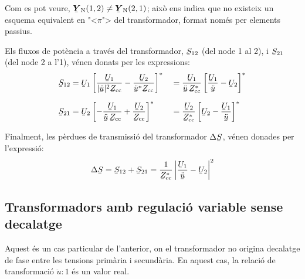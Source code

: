 Com es pot veure, $\mcmplx{Y}\ped{N}(1,2) \neq
\mcmplx{Y}\ped{N}(2,1)$; aix\`{o} ens indica que no existeix un esquema
equivalent en {"<}$\pi${">} del transformador, format nom\'{e}s per elements
passius.

Els fluxos de pot\`{e}ncia a trav\'{e}s del transformador, $\cmplx{S}_{12}$
(del node 1 al 2), i $\cmplx{S}_{21}$ (del node 2 a l'1), v\'{e}nen
donats per les expressions: 
\begin{alignat}{2}
   \cmplx{S}_{12} &= \cmplx{U}_1 \left[ \frac{\cmplx{U}_1}{|\cmplx{\ddot{u}}|^2 \cmplx{Z}\ped{cc}} - \frac{\cmplx{U}_2}{\cmplx{\ddot{u}}^* \cmplx{Z}\ped{cc}} \right]^* &&= \frac{\cmplx{U}_1}{\cmplx{\ddot{u}}\, \cmplx{Z}\ped{cc}^*} \left[ \frac{\cmplx{U}_1}{\cmplx{\ddot{u}}} - \cmplx{U}_2 \right]^* \label{eq:s12_trafo_reg_decal} \\[1.5ex]
   \cmplx{S}_{21} &= \cmplx{U}_2 \left[ - \frac{\cmplx{U}_1}{\cmplx{\ddot{u}} \,\cmplx{Z}\ped{cc}} + \frac{\cmplx{U}_2} {\cmplx{Z}\ped{cc}} \right]^* &&= \frac{\cmplx{U}_2}{\cmplx{Z}\ped{cc}^*} \left[  \cmplx{U}_2 - \frac{\cmplx{U}_1}{\cmplx{\ddot{u}}}  \right]^* \label{eq:s21_trafo_reg_decal}
\end{alignat}

Finalment, les p\`{e}rdues de transmissi\'{o} del transformador
$\Delta\cmplx{S}$, v\'{e}nen donades per l'expressi\'{o}:
\begin{equation} \label{eq:ds_trafo_reg_decal}
   \Delta\cmplx{S} = \cmplx{S}_{12} + \cmplx{S}_{21} = \frac{1}{\cmplx{Z}\ped{cc}^*}  \left|
    \frac{\cmplx{U}_1}{\cmplx{\ddot{u}}} - \cmplx{U}_2 \right|^2
\end{equation}


\subsection{Transformadors amb regulaci\'{o} variable sense decalatge} \label{sec:trafo_reg}

Aquest \'{e}s un cas particular de l'anterior, on el transformador no origina decalatge de
fase entre les tensions prim\`{a}ria i secund\`{a}ria. En aquest cas, la relaci\'{o} de transformaci\'{o}
$\ddot{u} : 1$ \'{e}s un valor real.

